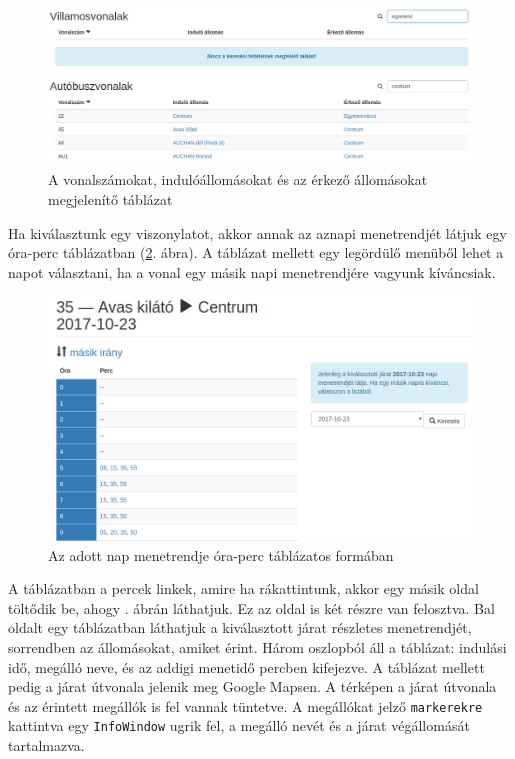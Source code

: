 \begin{figure}[h!]
\centering
\includegraphics[scale=0.32]{kepek/vonalak_tablazat.png}
\caption{A vonalszámokat, indulóállomásokat és az érkező állomásokat megjelenítő táblázat}
\label{fig:vonalak_tablazat}
\end{figure}

Ha kiválasztunk egy viszonylatot, akkor annak az aznapi menetrendjét látjuk egy óra-perc táblázatban (\ref{fig:menetrend}. ábra). A táblázat mellett egy legördülő menüből lehet a napot választani, ha a vonal egy másik napi menetrendjére vagyunk kíváncsiak.

\begin{figure}[h!]
\centering
\includegraphics[scale=0.4]{kepek/menetrend.png}
\caption{Az adott nap menetrendje óra-perc táblázatos formában}
\label{fig:menetrend}
\end{figure}

A táblázatban a percek linkek, amire ha rákattintunk, akkor egy másik oldal töltődik be, ahogy . ábrán láthatjuk. Ez az oldal is két részre van felosztva. Bal oldalt egy táblázatban láthatjuk a kiválasztott járat részletes menetrendjét, sorrendben az állomásokat, amiket érint. Három oszlopból áll a táblázat: indulási idő, megálló neve, és az addigi menetidő percben kifejezve. A táblázat mellett pedig a járat útvonala jelenik meg Google Mapsen. A térképen a járat útvonala és az érintett megállók is fel vannak tüntetve. A megállókat jelző \texttt{markerekre} kattintva egy \texttt{InfoWindow} ugrik fel, a megálló nevét és a járat végállomását tartalmazva.

